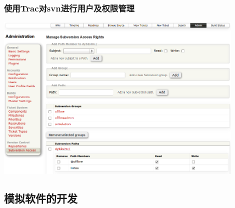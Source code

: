 \begin{frame}
    \frametitle{使用Trac对svn进行用户及权限管理}
    \includegraphics[width=12cm,keepaspectratio]{data/trac_svn.png}
\end{frame}

\subsection{模拟软件的开发}

